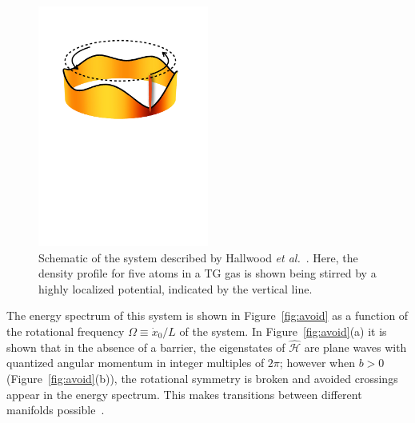 \begin{figure}
\center \includegraphics[width = 0.5\textwidth]{data/1d/scheme.pdf}
\caption{Schematic of the system described by Hallwood \textit{et al.}~\cite{hallwood2010}.
Here, the density profile for five atoms in a TG gas is shown being stirred by a highly localized potential, indicated by the vertical line.}
\label{fig:ring_scheme}
\end{figure}

The energy spectrum of this system is shown in Figure~\ref{fig:avoid} as a function of the rotational frequency $\Omega \equiv \dot x_0 /L$ of the system.
In Figure~\ref{fig:avoid}(a) it is shown that in the absence of a barrier, the eigenstates of $\mathcal{\hat H}$ are plane waves with quantized angular momentum in integer multiples of $2 \pi$; however when $b>0$ (Figure~\ref{fig:avoid}(b)), the rotational symmetry is broken and avoided crossings appear in the energy spectrum.
This makes transitions between different manifolds possible~\cite{schenke2012}.

